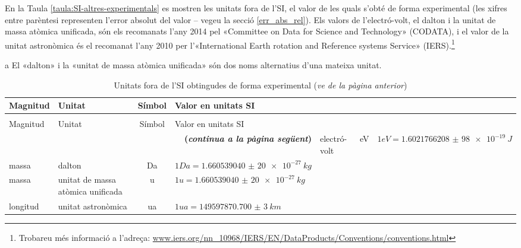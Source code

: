 En la Taula \vref{taula:SI-altres-experimentals} es mostren les unitats fora de l'SI, el valor de les quals s'obté de forma experimental (les xifres entre parèntesi representen l'error absolut del valor -- vegeu la secció \ref{err_abs_rel}). Els valors de l'electró-volt, el dalton i la unitat de massa atòmica unificada, són els recomanats
l'any 2014 pel «Committee on Data for Science and Technology» (CODATA), i el valor de la unitat astronòmica és el recomanat l'any 2010 per l'«International Earth rotation and Reference systems Service» (IERS).\footnote{Trobareu més informació a l'adreça: \href{http://www.iers.org/nn_10968/IERS/EN/DataProducts/Conventions/conventions.html}{www.iers.org/nn\_10968/IERS/EN/DataProducts/Conventions/conventions.html}} 

\begin{ThreePartTable}
\begin{TableNotes}
    \item[a] {\footnotesize El «dalton» i la «unitat de massa atòmica unificada» són dos noms alternatius d'una mateixa unitat.}
\end{TableNotes}
\begin{longtable}[h]{llcl}
   \caption{\label{taula:SI-altres-experimentals} Unitats fora de l'SI obtingudes de forma experimental }\\
   \toprule[1pt]
    Magnitud & Unitat &  Símbol & Valor en unitats SI\\
   \midrule
   \endfirsthead
   \caption[]{Unitats fora de l'SI obtingudes de forma experimental (\emph{ve de la pàgina
   anterior})}\\
   \toprule[1pt]
    Magnitud & Unitat &  Símbol & Valor en unitats SI\\
   \midrule
   \endhead
   \midrule
   \multicolumn{4}{r}{\sffamily\bfseries\color{NavyBlue}(\emph{continua a la pàgina següent})}
   \endfoot
   \insertTableNotes
   \endlastfoot
   energia & electró-volt & \unit{eV} & $1\unit{eV} = \SI{1,6021766208(98)e-19}{J}$ \\
   massa & dalton\tnote{a} & Da & $1\unit{Da} = \SI{1,660539040(20)e-27}{kg}$\\
   massa & unitat de massa atòmica unificada\tnote{a} & u & $1\unit{u} =
    \SI{1,660539040(20)e-27}{kg}$  \\
   longitud & unitat astronòmica &  \unit{ua} &  $1\unit{ua} =  \SI{149597870,700(3)}{km}$ \\
\bottomrule[1pt]
\end{longtable}
\end{ThreePartTable}


